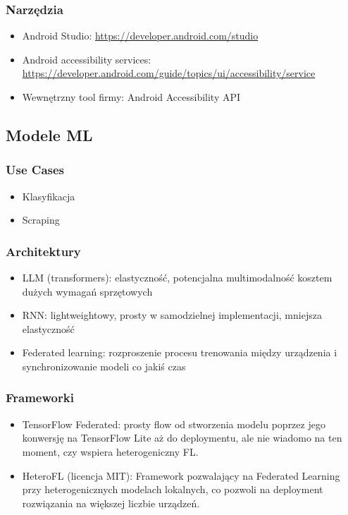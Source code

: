 \documentclass[12pt]{article}
\begin{document}
\subsubsection*{Narzędzia}
\begin{itemize}
    \item Android Studio: \url{https://developer.android.com/studio}
    \item Android accessibility services: \url{https://developer.android.com/guide/topics/ui/accessibility/service}
    \item Wewnętrzny tool firmy: Android Accessibility API
\end{itemize}

\subsection*{Modele ML}

\subsubsection*{Use Cases}
\begin{itemize}
    \item Klasyfikacja
    \item Scraping
\end{itemize}

\subsubsection*{Architektury}
\begin{itemize}
    \item LLM (transformers): elastyczność, potencjalna multimodalność kosztem dużych wymagań sprzętowych
    \item RNN: lightweightowy, prosty w samodzielnej implementacji, mniejsza elastyczność
    \item Federated learning: rozproszenie procesu trenowania między urządzenia i synchronizowanie modeli co jakiś czas
\end{itemize}

\subsubsection*{Frameworki}
\begin{itemize}
    \item TensorFlow Federated: prosty flow od stworzenia modelu poprzez jego konwersję na TensorFlow Lite aż do deploymentu, ale nie wiadomo na ten moment, czy wspiera heterogeniczny FL.
    \item HeteroFL (licencja MIT): Framework pozwalający na Federated Learning przy heterogenicznych modelach lokalnych, co pozwoli na deployment rozwiązania na większej liczbie urządzeń.
\end{itemize}
\end{document}
